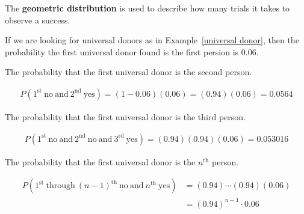 \documentclass{beamer}
\newcommand{\prob}[1]{P\left({#1}\right)}
\newcommand{\jointprob}[3]{\prob{{#1}~\text{#2}~{#3}}}
\begin{document}
\begin{frame}
  \begin{definition}
    The \textbf{geometric distribution} is used to describe how many trials it takes to observe a success.
  \end{definition}\pause

  \begin{example}
    If we are looking for universal donors as in Example~\ref{universal donor}, then the probability the first universal donor found is the first persion is $0.06$.\pause

    \vspace{1mm}
    The probability that the first universal donor is the second person.

    \vspace{-6mm}
    \begin{equation*}
      \begin{aligned}
        \jointprob{1^{\text{st}}~\text{no}}{and}{2^{\text{nd}}~\text{yes}} = (1-0.06)(0.06) = (0.94)(0.06) = 0.0564
      \end{aligned}
    \end{equation*}\pause

    \vspace{-6mm}
    The probability that the first universal donor is the third person.

    \vspace{-6mm}
    \begin{equation*}
      \begin{aligned}
        \jointprob{1^{\text{st}}~\text{no}~\text{and}~2^{\text{nd}}~\text{no}}{and}{3^{\text{rd}}~\text{yes}} = (0.94)(0.94)(0.06) = 0.053016
      \end{aligned}
    \end{equation*}\pause

    \vspace{-6mm}
    The probability that the first universal donor is the $n^{\text{th}}$ person.

    \vspace{-6mm}
    \begin{equation*}
      \begin{aligned}
        \jointprob{1^{\text{st}}~\text{through}~{(n-1)}^{\text{th}}~\text{no}}{and}{n^{\text{th}}~\text{yes}} &= (0.94)\cdots(0.94)(0.06)\\
        &= {(0.94)}^{n-1}\cdot0.06
      \end{aligned}
    \end{equation*}
  \end{example}
\end{frame}
\end{document}

